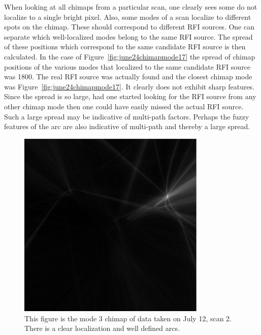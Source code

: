 \documentclass[a4paper,12pt]{article}
\begin{document}
                                          When looking at all chimaps from a particular scan, one clearly sees some do not localize to a single bright pixel. Also, some modes of a scan localize to different spots on the chimap. These should correspond to different RFI sources. One can separate which well-localized modes belong to the same RFI source. The spread of these positions which correspond to the same candidate RFI source is then calculated.
                                                    In the case of Figure~\ref{fig:june24chimapmode17} the spread of chimap positions of the various modes that localized to the same candidate RFI source was \unit{1800}{\metre}. The real RFI source was actually found and the closest chimap mode was Figure~\ref{fig:june24chimapmode17}. It clearly does not exhibit sharp features. Since the spread is so large, had one started looking for the RFI source from any other chimap mode then one could have easily missed the actual RFI source. Such a large spread may be indicative of multi-path factors. Perhaps the fuzzy features of the arc are also indicative of multi-path and thereby a large spread.

                                                              \begin{figure}
                                                                          \begin{center}
                                                                                          \includegraphics[width=0.8\textwidth]{july12chimapmode3.pdf}
                                                                                                            \end{center}
                                                                                                                                \caption{This figure is the mode 3 chimap of data taken on July 12, scan 2. There is a clear localization and well defined arcs. \label{fig:july12chimapmode3}}
                                                                                                                                                    \end{figure}
\end{document}

